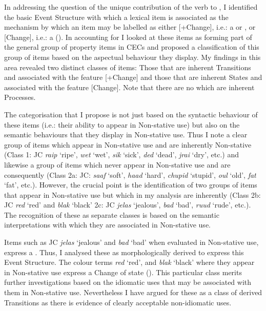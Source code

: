 In addressing the question of the unique contribution of the verb to , I identified the basic Event Structure with which a lexical item is associated as the mechanism by which an item may be labelled as either [+Change], i.e.: a  or , or [\textminus Change], i.e.: a  (\citealt{Pustejovsky1988,Pustejovsky1991}). In accounting for  I looked at these items as forming part of the general group of property items in CECs and proposed a classification of this group of items based on the aspectual behaviour they display. My findings in this area revealed two distinct classes of items: Those that are inherent Transitions and associated with the feature [+Change] and those that are inherent States and associated with the feature [\textminus Change]. Note that there are no  which are inherent Processes. 

The categorisation that I propose is not just based on the syntactic behaviour of these items (i.e.: their ability to appear in Non-stative use) but also on the semantic behaviours that they display in Non-stative use. Thus I note a clear group of items which appear in Non-stative use and are inherently Non-stative (Class 1: JC \textit{raip} `ripe', \textit{wet} `wet', \textit{sik} `sick', \textit{ded} `dead', \textit{jrai} `dry', etc.) and likewise a group of items which never appear in Non-stative use and are consequently  (Class 2a: JC: \textit{saaf}  `soft’, \textit{haad} `hard', \textit{chupid} `stupid', \textit{oul} `old', \textit{fat} `fat', etc.). However, the crucial point is the identification of two groups of items that appear in Non-stative use but which in my analysis are inherently  (Class 2b: JC \textit{red} `red' and \textit{blak} `black' 2c: JC \textit{jelas} `jealous', \textit{bad} `bad', \textit{ruud} `rude', etc.). The recognition of these as separate classes is based on the semantic interpretations with which they are associated in Non-stative use. 

Items such as JC \textit{jelas} `jealous' and \textit{bad} `bad' when evaluated in Non-stative use, express a . Thus, I analysed these as morphologically derived to express this Event Structure. The colour terms \textit{red} `red', and \textit{blak} `black' where they appear in Non-stative use express a Change of state (). This particular class merits further investigations based on the idiomatic uses that may be associated with them in Non-stative use. Nevertheless I have argued for these as a class of derived Transitions as there is evidence of clearly acceptable non-idiomatic uses. 

